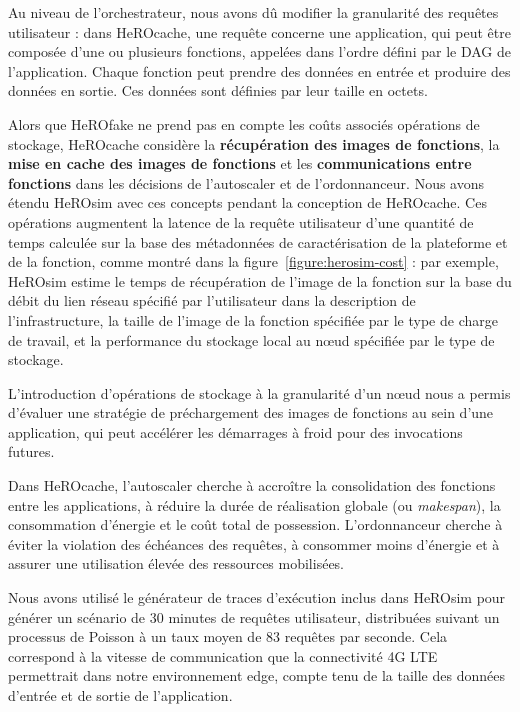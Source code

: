 Au niveau de l'orchestrateur, nous avons dû modifier la granularité des requêtes utilisateur : dans HeROcache, une requête concerne une application, qui peut être composée d'une ou plusieurs fonctions, appelées dans l'ordre défini par le \gls{DAG} de l'application. Chaque fonction peut prendre des données en entrée et produire des données en sortie. Ces données sont définies par leur taille en octets.

Alors que HeROfake ne prend pas en compte les coûts associés opérations de stockage, HeROcache considère la \textbf{récupération des images de fonctions}, la \textbf{mise en cache des images de fonctions} et les \textbf{communications entre fonctions} dans les décisions de l'autoscaler et de l'ordonnanceur. Nous avons étendu HeROsim avec ces concepts pendant la conception de HeROcache. Ces opérations augmentent la latence de la requête utilisateur d'une quantité de temps calculée sur la base des métadonnées de caractérisation de la plateforme et de la fonction, comme montré dans la figure~\ref{figure:herosim-cost} : par exemple, HeROsim estime le temps de récupération de l'image de la fonction sur la base du débit du lien réseau spécifié par l'utilisateur dans la description de l'infrastructure, la taille de l'image de la fonction spécifiée par le type de charge de travail, et la performance du stockage local au nœud spécifiée par le type de stockage.

L'introduction d'opérations de stockage à la granularité d'un nœud nous a permis d'évaluer une stratégie de préchargement des images de fonctions au sein d'une application, qui peut accélérer les démarrages à froid pour des invocations futures.

Dans HeROcache, l'autoscaler cherche à accroître la consolidation des fonctions entre les applications, à réduire la durée de réalisation globale (ou \textit{makespan}), la consommation d'énergie et le coût total de possession. L'ordonnanceur cherche à éviter la violation des échéances des requêtes, à consommer moins d'énergie et à assurer une utilisation élevée des ressources mobilisées.

Nous avons utilisé le générateur de traces d'exécution inclus dans HeROsim pour générer un scénario de 30 minutes de requêtes utilisateur, distribuées suivant un processus de Poisson à un taux moyen de 83 requêtes par seconde. Cela correspond à la vitesse de communication que la connectivité 4G LTE permettrait dans notre environnement edge, compte tenu de la taille des données d'entrée et de sortie de l'application.

